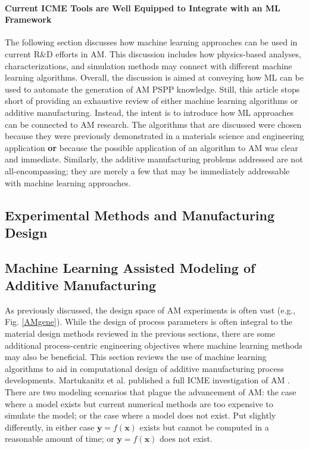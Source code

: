 \paragraph{Current ICME Tools are Well Equipped to Integrate with an ML Framework}

The following section discusses how machine learning approaches can be used in current R\&D efforts in AM. This discussion includes how physics-based analyses, characterizations, and simulation methods may connect with different machine learning algorithms. Overall, the discussion is aimed at conveying how ML can be used to automate the generation of AM PSPP knowledge. Still, this article stops short of providing an exhaustive review of either machine learning algorithms or additive manufacturing. Instead, the intent is to introduce how ML approaches can be connected to AM research. The algorithms that are discussed were chosen because they were previously demonstrated in a materials science and engineering application \textbf{or} because the possible application of an algorithm to AM was clear and immediate. Similarly, the additive manufacturing problems addressed are not all-encompassing; they are merely a few that may be immediately addressable with machine learning approaches. 

\subsection{Experimental Methods and Manufacturing Design}





\subsection{Machine Learning Assisted Modeling of Additive Manufacturing}
As previously discussed, the design space of AM experiments is often vast (e.g., Fig. \ref{AMgene}). While the design of process parameters is often integral to the material design methods reviewed in the previous sections, there are some additional process-centric engineering objectives where machine learning methods may also be beneficial. This section reviews the use of machine learning algorithms to aid in computational design of additive manufacturing process developments. Martukanitz et al. published a full ICME investigation of AM \cite{Martukanitz2014}. There are two modeling scenarios that plague the advancement of AM: the case where a model exists but current numerical methods are too expensive to simulate the model; or the case where a model does not exist. Put slightly differently, in either case $\mathbf{y} = f(\mathbf{x})$ exists but cannot be computed in a reasonable amount of time; or $\mathbf{y} = f(\mathbf{x})$ does not exist. 

